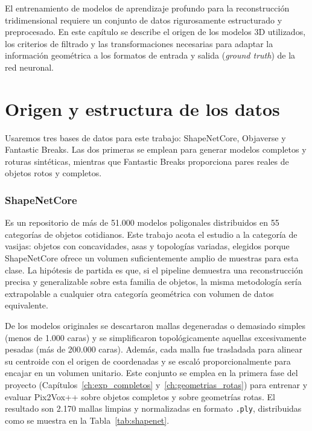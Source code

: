 \documentclass[10pt,a4paper]{report}
\begin{document}
El entrenamiento de modelos de aprendizaje profundo para la reconstrucción tridimensional
requiere un conjunto de datos rigurosamente estructurado y preprocesado.
En este capítulo se describe el origen de los modelos 3D utilizados, los criterios de
filtrado y las transformaciones necesarias para adaptar la información geométrica a los
formatos de entrada y salida (\textit{ground truth}) de la red neuronal.

\section{Origen y estructura de los datos}
\label{sec:datos_origen}

Usaremos tres bases de datos para este trabajo: ShapeNetCore, Objaverse y
Fantastic Breaks. Las dos primeras se emplean para generar modelos completos
y roturas sintéticas, mientras que Fantastic Breaks proporciona pares reales
de objetos rotos y completos.


\subsubsection*{ShapeNetCore \textnormal{\citep{chang2015shapenet}}}
Es un repositorio de más de 51.000 modelos poligonales distribuidos en 55 categorías de objetos cotidianos.
Este trabajo acota el estudio a la categoría de vasijas: objetos con concavidades,
asas y topologías variadas, elegidos porque ShapeNetCore ofrece un volumen suficientemente
amplio de muestras para esta clase.
La hipótesis de partida es que, si el pipeline demuestra una reconstrucción precisa y
generalizable sobre esta familia de objetos, la misma metodología sería extrapolable a
cualquier otra categoría geométrica con volumen de datos equivalente.

De los modelos originales se descartaron mallas degeneradas o demasiado simples (menos
de 1.000 caras) y se simplificaron topológicamente aquellas excesivamente pesadas (más
de 200.000 caras).
Además, cada malla fue trasladada para alinear su centroide con el origen de coordenadas
y se escaló proporcionalmente para encajar en un volumen unitario. Este conjunto se emplea en la primera fase del proyecto (Capítulos~\ref{ch:exp_completos}
y~\ref{ch:geometrias_rotas}) para entrenar y evaluar Pix2Vox++ sobre objetos completos
y sobre geometrías rotas.
El resultado son 2.170 mallas limpias y normalizadas en formato \texttt{.ply},
distribuidas como se muestra en la Tabla~\ref{tab:shapenet}.
\end{document}
